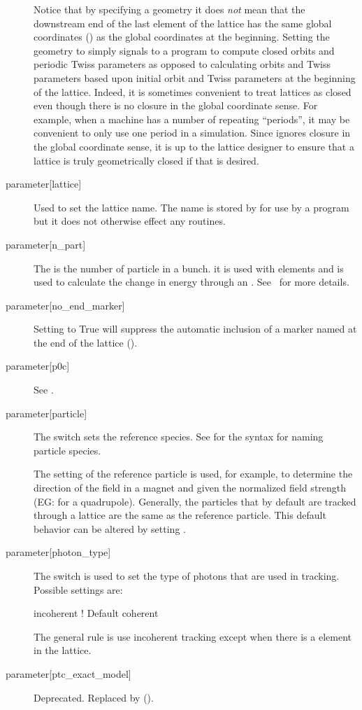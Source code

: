 \begin{description}
Notice that by specifying a  geometry it does {\em not} mean that the downstream end of
the last element of the lattice has the same global coordinates () as the global
coordinates at the beginning. Setting the geometry to  simply signals to a program to
compute closed orbits and periodic Twiss parameters as opposed to calculating orbits and Twiss
parameters based upon initial orbit and Twiss parameters at the beginning of the lattice.  Indeed,
it is sometimes convenient to treat lattices as closed even though there is no closure in the global
coordinate sense. For example, when a machine has a number of repeating ``periods'', it may be
convenient to only use one period in a simulation. Since \bmad ignores closure in the global
coordinate sense, it is up to the lattice designer to ensure that a lattice is truly geometrically
closed if that is desired.
%
  \item[{parameter[lattice]}] \Newline
Used to set the lattice name. The  name is stored by \bmad for use by a program but it
does not otherwise effect any \bmad routines.
%
  \item[{parameter[n_part]}] \Newline
The  is the number of particle in a bunch.  it is used with 
elements and is used to calculate the change in energy through an . See~
for more details.
%
  \item[{parameter[no_end_marker]}] \Newline
Setting  to True will suppress the automatic inclusion
of a marker named  at the end of the lattice (). 
%
  \item[{parameter[p0c]}] \Newline
See .
%
  \item[{parameter[particle]}] \Newline
The  switch sets the reference species. See  for the
syntax for naming particle species.

The setting of the reference particle is used, for example, to determine the direction of the field
in a magnet and given the normalized field strength (EG:  for a quadrupole).  Generally, the
particles that by default are tracked through a lattice are the same as the reference particle. This
default behavior can be altered by setting .

%
  \item[{parameter[photon_type]}] \Newline
The  switch is used to set the type of photons that are used in tracking. Possible
settings are:
\begin{example}
  incoherent    ! Default
  coherent 
\end{example}
The general rule is use incoherent tracking except when there is a  element in
the lattice.
%
  \item[{parameter[ptc_exact_model]}] \Newline
Deprecated. Replaced by  ().


\end{description}
